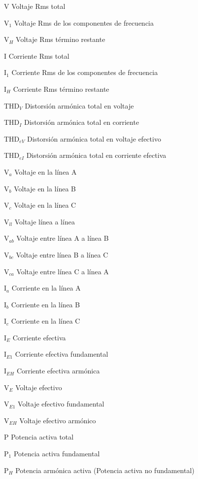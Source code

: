 \begin{abbrv}
\item[V]			Voltaje Rms total
\item[V$_{1}$]		Voltaje Rms de los componentes de frecuencia
\item[V$_{H}$]		Voltaje Rms término restante
\item[I]			Corriente Rms total
\item[I$_{1}$]		Corriente Rms de los componentes de frecuencia
\item[I$_{H}$]		Corriente Rms término restante

\item[THD$_{V}$]		Distorsión armónica total en  voltaje
\item[THD$_{I}$]		Distorsión armónica total en corriente
\item[THD$_{eV}$]		Distorsión armónica total en  voltaje efectivo
\item[THD$_{eI}$]		Distorsión armónica total en corriente efectiva
\item[V$_{a}$]      Voltaje en la línea A
\item[V$_{b}$]      Voltaje en la línea B
\item[V$_{c}$]      Voltaje en la línea C
\item[V$_{ll}$]     Voltaje línea a línea
\item[V$_{ab}$]      Voltaje entre línea A a línea B
\item[V$_{bc}$]      Voltaje entre línea B a línea C
\item[V$_{ca}$]      Voltaje entre línea C a línea A 
\item[I$_{a}$]      Corriente en la línea A
\item[I$_{b}$]      Corriente en la línea B
\item[I$_{c}$]      Corriente en la línea C

\item[I$_{E}$]		Corriente efectiva
\item[I$_{E1}$]		Corriente efectiva fundamental
\item[I$_{EH}$]		Corriente efectiva armónica
\item[V$_{E}$]		Voltaje efectivo
\item[V$_{E1}$]		Voltaje efectivo fundamental
\item[V$_{EH}$]		Voltaje efectivo armónico

\item[P]			Potencia activa total
\item[P$_{1}$]		Potencia activa fundamental
\item[P$_{H}$]		Potencia armónica activa (Potencia activa no fundamental)


\end{abbrv}
